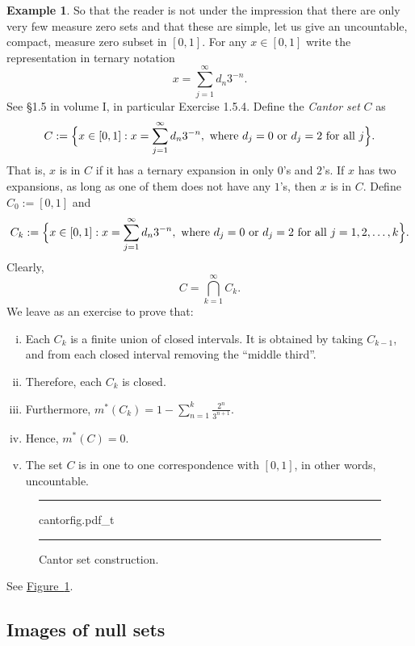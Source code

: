 \documentclass[12pt]{book}
\newcommand{\volIref}[1]{#1}
\newenvironment{myfigureht}{%
\begin{figure}[h!t]
\noindent\rule{\textwidth}{0.4pt}\vspace{12pt}\par\centering}%
{\par\noindent\rule{\textwidth}{0.4pt}
\end{figure}}
\newcommand{\myindex}[1]{#1\index{#1}}
\theoremstyle{plain}
\theoremstyle{remark}
\theoremstyle{definition}
\theoremstyle{exercise}
\theoremstyle{example}
\newtheorem{example}[thm]{Example}
\newcommand{\figureref}[1]{\hyperref[#1]{Figure~\ref*{#1}}}
\begin{document}
\begin{example} \label{example:cantor}
So that the reader is not under the impression that there are only very few
measure zero sets and that these are simple,
let us give an uncountable, compact, measure zero subset in $[0,1]$.
For any $x \in [0,1]$ write the
representation in ternary notation
\begin{equation*}
x = \sum_{j=1}^\infty d_n 3^{-n} .
\end{equation*}
See \volIref{\S1.5 in volume I, in particular Exercise 1.5.4}.
Define the \emph{\myindex{Cantor set}} $C$ as
\begin{equation*}
C := \Bigl\{ x \in [0,1] : x = \sum_{j=1}^\infty d_n 3^{-n}, \text{ where $d_j =
0$ or $d_j = 2$ for all $j$} \Bigr\} .
\end{equation*}
That is, $x$ is in $C$ if it has a ternary expansion in only $0$'s and
$2$'s.  If $x$ has two expansions, as long as one of them does not have any
$1$'s, then $x$ is in $C$.
Define $C_0 := [0,1]$ and
\begin{equation*}
C_k := \Bigl\{ x \in [0,1] : x = \sum_{j=1}^\infty d_n 3^{-n}, \text{ where $d_j =
0$ or $d_j = 2$ for all $j=1,2,\ldots,k$} \Bigr\} .
\end{equation*}
Clearly,
\begin{equation*}
C = \bigcap_{k=1}^\infty C_k .
\end{equation*}
We leave as an exercise to prove that:
\begin{enumerate}[(i)]
\item Each $C_k$ is a finite union of closed intervals.  It is obtained by
taking $C_{k-1}$, and from each closed interval removing the ``middle
third''.
\item Therefore, each $C_k$ is closed.
\item Furthermore,
$m^*(C_k) =1 - \sum_{n=1}^k \frac{2^n}{3^{n+1}}$.
\item Hence,
$m^*(C) = 0$.
\item The set $C$ is in one to one correspondence with $[0,1]$, in other
words,
uncountable.
\end{enumerate}
\begin{myfigureht}
{cantorfig.pdf_t}
\caption{Cantor set construction.\label{fig:cantor}}
\end{myfigureht}
See \figureref{fig:cantor}.
\end{example}


\subsection{Images of null sets}
\end{document}
